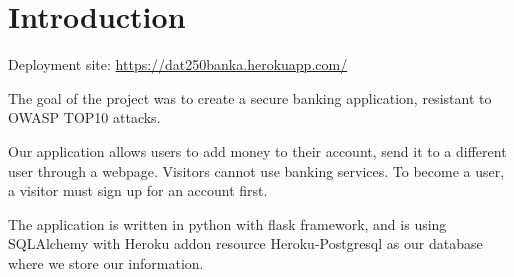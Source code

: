 \chapter*{Introduction}\label{kap:introduction}

Deployment site: \url{https://dat250banka.herokuapp.com/}

The goal of the project was to create a secure banking application, resistant to OWASP TOP10 attacks.

Our application allows users to add money to their account,  send it to a different user through a webpage. Visitors cannot use banking services. To become a user, a visitor must sign up for an account first.

The application is written in python with flask framework, and is using SQLAlchemy with Heroku addon resource Heroku-Postgresql as our database where we store our information. 